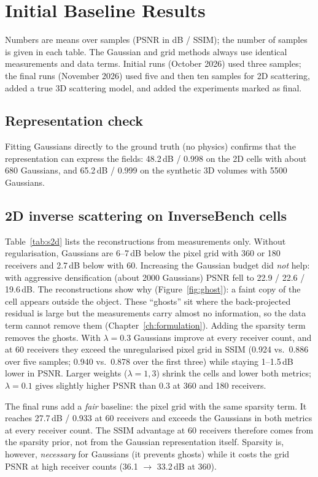 \chapter{Initial Baseline Results}
\label{ch:results}

Numbers are means over samples (PSNR in dB / SSIM); the number of samples is given in each table. The Gaussian and
grid methods always use identical measurements and data terms. Initial runs (October 2026) used three samples; the
final runs (November 2026) used five and then ten samples for 2D scattering, added a true 3D scattering model, and
added the experiments marked as final.

\section{Representation check}
Fitting Gaussians directly to the ground truth (no physics) confirms that the representation can express the
fields: 48.2\,dB / 0.998 on the 2D cells with about 680 Gaussians, and 65.2\,dB / 0.999 on the synthetic 3D volumes
with 5500 Gaussians.

\section{2D inverse scattering on InverseBench cells}
\label{sec:ghost}
Table~\ref{tab:s2d} lists the reconstructions from measurements only. Without regularisation, Gaussians are 6--7\,dB
below the pixel grid with 360 or 180 receivers and 2.7\,dB below with 60. Increasing the Gaussian budget did
\emph{not} help: with aggressive densification (about 2000 Gaussians) PSNR fell to 22.9 / 22.6 / 19.6\,dB. The
reconstructions show why (Figure~\ref{fig:ghost}): a faint copy of the cell appears outside the object. These
``ghosts'' sit where the back-projected residual is large but the measurements carry almost no information, so the
data term cannot remove them (Chapter~\ref{ch:formulation}). Adding the sparsity term removes the ghosts. With
$\lambda=0.3$ Gaussians improve at every receiver count, and at 60 receivers they exceed the unregularised pixel
grid in SSIM (0.924 vs.\ 0.886 over five samples; 0.940 vs.\ 0.878 over the first three) while staying 1--1.5\,dB lower
in PSNR. Larger weights ($\lambda=1,3$) shrink the cells and lower both metrics; $\lambda=0.1$ gives slightly higher
PSNR than 0.3 at 360 and 180 receivers.

The final runs add a \emph{fair} baseline: the pixel grid with the same sparsity term. It reaches 27.7\,dB / 0.933 at
60 receivers and exceeds the Gaussians in both metrics at every receiver count. The SSIM advantage at 60 receivers
therefore comes from the sparsity prior, not from the Gaussian representation itself. Sparsity is, however,
\emph{necessary} for Gaussians (it prevents ghosts) while it costs the grid PSNR at high receiver counts
(36.1 $\to$ 33.2\,dB at 360).

